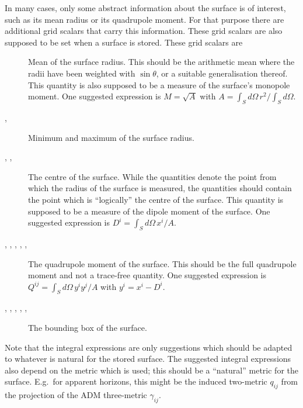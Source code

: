 In many cases, only some abstract information about the surface is of
interest, such as its mean radius or its quadrupole moment.  For that
purpose there are additional grid scalars that carry this information.
These grid scalars are also supposed to be set when a surface is
stored.  These grid scalars are
\begin{description}

\item[] Mean of the surface radius.  This
should be the arithmetic mean where the radii have been weighted with
$\sin\theta$, or a suitable generalisation thereof.  This quantity is
also supposed to be a measure of the surface's monopole moment.  One
suggested expression is $M=\sqrt{A}$ with $A = \int_S d\Omega\, r^2 /
\int_S d\Omega$.

\item[, ] Minimum and
maximum of the surface radius.

\item[, ,
] The centre of the surface.  While the
quantities  denote the point from which the
radius of the surface is measured, the quantities
 should contain the point which is
``logically'' the centre of the surface.  This quantity is supposed to
be a measure of the dipole moment of the surface.  One suggested
expression is $D^i = \int_S d\Omega\, x^i / A$.

\item[, ,
, ,
, ] The
quadrupole moment of the surface. This should be the full quadrupole
moment and not a trace-free quantity.  One suggested expression is
$Q^{ij} = \int_S d\Omega\, y^i y^j / A$ with $y^i = x^i - D^i$.

\item[, , ,
, , ] The
bounding box of the surface.

\end{description}
Note that the integral expressions are only suggestions which should
be adapted to whatever is natural for the stored surface.  The
suggested integral expressions also depend on the metric which is
used; this should be a ``natural'' metric for the surface.  E.g.\ for
apparent horizons, this might be the induced two-metric $q_{ij}$ from
the projection of the ADM three-metric $\gamma_{ij}$.



